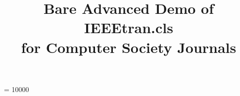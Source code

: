 \documentclass[10pt,journal,compsoc]{IEEEtran}
\begin{document}
\widowpenalty = 10000
\newcommand{\xhdr}[1]{{\vspace{6pt}\noindent\textbf{\textit{#1}}}}

\newcommand{\soic}{\affaddr{School of Informatics \& Computing}\\ 
\affaddr{Indiana University}\\
\affaddr{Bloomington, IN}\\}




\newcommand{\leaveout}[1]{}


\newcommand{\mustfix}[1]{\fixme{\hl{#1}}}
\newcommand{\pleasenote}[1]{\fxnote{\hl{#1}}}
\newcommand{\hlfixme}[1]{\fixme{\hl{#1}}}
\newcommand{\hlfxnote}[1]{\fxnote{\hl{#1}}}

\newenvironment{packed_itemize}{
\begin{itemize}
  \setlength{\itemsep}{0pt}
  \setlength{\parskip}{0pt}
  \setlength{\parsep}{0pt}
\vspace{-4pt}
}{\end{itemize}}

%
\title{Bare Advanced Demo of IEEEtran.cls\\ for Computer Society Journals}
%
%
%
%
\end{document}
